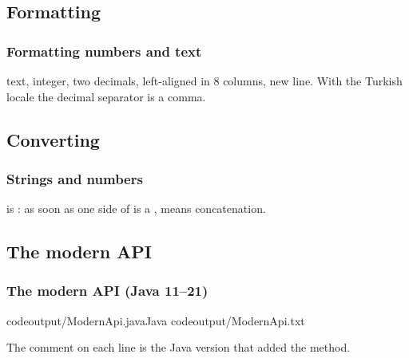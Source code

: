 \documentclass[aspectratio=169,10pt,compress]{beamer}
\begin{document}
\subsection[Format]{Formatting}




\begin{frame}[t,fragile] \frametitle{Formatting numbers and text}

  \vspace{0.3em}
  \small 
   text, 
   integer, 
   two decimals, 
   left-aligned in 8 columns, 
   new line.
  With the Turkish locale the decimal separator is a comma.
\end{frame}




\subsection[Convert]{Converting}




\begin{frame}[t,fragile] \frametitle{Strings and numbers}

  \vspace{0.3em}
  \small {} is : 
  as soon as one side of \hCode{+} is a , \hCode{+} means concatenation.
\end{frame}



\subsection[API]{The modern API}




\begin{frame}[t,fragile] \frametitle{The modern  API (Java 11--21)}

	\lstcodeoverlaystep
		[basicstyle=\ttfamily\scriptsize]
		[basicstyle=\ttfamily\scriptsize][0.28\textwidth]{12.0cm,2.25cm}
			{codeoutput/ModernApi.java}{Java}
			{codeoutput/ModernApi.txt}

	\vspace{0.2em}
	\small The comment on each line is the Java version that added the method.
\end{frame}
\end{document}
